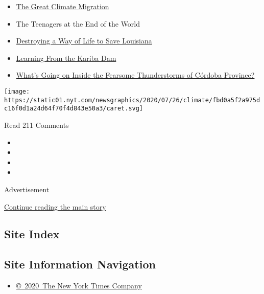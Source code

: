 \begin{itemize}
\tightlist
\item
  \href{https://www.nytimes.com/interactive/2020/07/23/magazine/climate-migration.html}{The
  Great Climate Migration}
\item
  The Teenagers at the End of the World
\item
  \href{https://www.nytimes.com/interactive/2020/07/21/magazine/louisiana-coast-engineering.html}{Destroying
  a Way of Life to Save Louisiana}
\item
  \href{https://www.nytimes.com/interactive/2020/07/22/magazine/zambia-kariba-dam.html}{Learning
  From the Kariba Dam}
\item
  \href{https://www.nytimes.com/interactive/2020/07/22/magazine/worst-storms-argentina.html}{What's
  Going on Inside the Fearsome Thunderstorms of Córdoba Province?}
\end{itemize}

\protect\hyperlink{}{} \protect\hyperlink{}{}

\texttt{[image: https://static01.nyt.com/newsgraphics/2020/07/26/climate/fbd0a5f2a975dc16f0d1a24d64f70f4d843e50a3/caret.svg]}

Read 211 Comments

\begin{itemize}
\item
\item
\item
\item
\end{itemize}

Advertisement

\protect\hyperlink{after-bottom}{Continue reading the main story}

\hypertarget{site-index}{%
\subsection{Site Index}\label{site-index}}

\hypertarget{site-information-navigation}{%
\subsection{Site Information
Navigation}\label{site-information-navigation}}

\begin{itemize}
\tightlist
\item
  \href{https://help.nytimes.com/hc/en-us/articles/115014792127-Copyright-notice}{©~2020~The
  New York Times Company}
\end{itemize}

